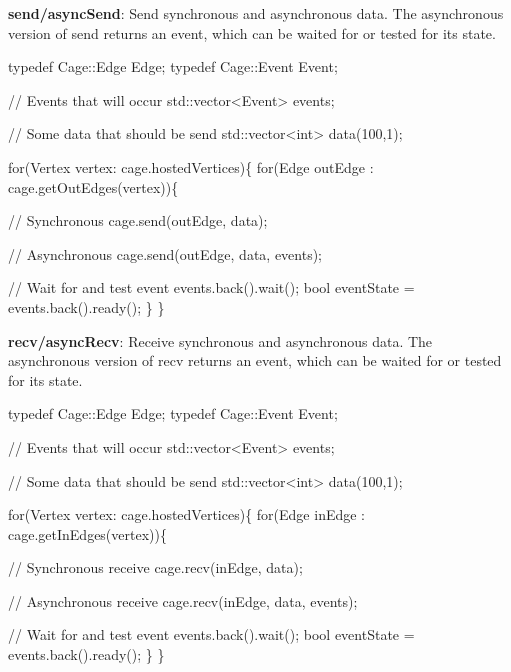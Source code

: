 \begin{DoxyItemize}
\item {\bfseries send/async\+Send}\+: Send synchronous and asynchronous data. The asynchronous version of send returns an event, which can be waited for or tested for its state. 
\begin{DoxyCode}
\textcolor{keyword}{typedef} Cage::Edge  Edge;
\textcolor{keyword}{typedef} Cage::Event Event;

\textcolor{comment}{// Events that will occur}
std::vector<Event> events;

\textcolor{comment}{// Some data that should be send}
std::vector<int> data(100,1);

\textcolor{keywordflow}{for}(Vertex vertex: cage.hostedVertices)\{
    \textcolor{keywordflow}{for}(Edge outEdge : cage.getOutEdges(vertex))\{

          \textcolor{comment}{// Synchronous}
      cage.send(outEdge, data);

      \textcolor{comment}{// Asynchronous}
      cage.send(outEdge, data, events);

          \textcolor{comment}{// Wait for and test event}
      events.back().wait();
      \textcolor{keywordtype}{bool} eventState = events.back().ready();
    \}
\}
\end{DoxyCode}

\item {\bfseries recv/async\+Recv}\+: Receive synchronous and asynchronous data. The asynchronous version of recv returns an event, which can be waited for or tested for its state. 
\begin{DoxyCode}
\textcolor{keyword}{typedef} Cage::Edge  Edge;
\textcolor{keyword}{typedef} Cage::Event Event;

\textcolor{comment}{// Events that will occur}
std::vector<Event> events;

\textcolor{comment}{// Some data that should be send}
std::vector<int> data(100,1);

\textcolor{keywordflow}{for}(Vertex vertex: cage.hostedVertices)\{
    \textcolor{keywordflow}{for}(Edge inEdge : cage.getInEdges(vertex))\{

        \textcolor{comment}{// Synchronous receive}
        cage.recv(inEdge, data);

        \textcolor{comment}{// Asynchronous receive}
        cage.recv(inEdge, data, events);

        \textcolor{comment}{// Wait for and test event}
        events.back().wait();
        \textcolor{keywordtype}{bool} eventState = events.back().ready();
    \}
\}
\end{DoxyCode}

\end{DoxyItemize}

